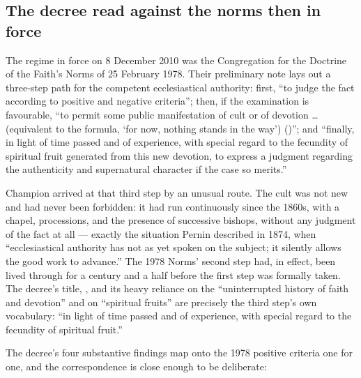 \subsection{The decree read against the norms then in force}

The regime in force on 8 December 2010 was the Congregation for the
Doctrine of the Faith's Norms of 25 February 1978. Their preliminary
note lays out a three-step path for the competent ecclesiastical
authority: first, ``to judge the fact according to positive and
negative criteria''; then, if the examination is favourable, ``to
permit some public manifestation of cult or of devotion \dots{}
(equivalent to the formula, `for now, nothing stands in the way')
()''; and ``finally, in light of time
passed and of experience, with special regard to the fecundity of
spiritual fruit generated from this new devotion, to express a judgment
regarding the authenticity and supernatural character if the case so
merits.''

Champion arrived at that third step by an unusual route. The cult was
not new and had never been forbidden: it had run continuously since the
1860s, with a chapel, processions, and the presence of successive
bishops, without any judgment of the fact at all --- exactly the
situation Pernin described in 1874, when ``ecclesiastical authority has
not as yet spoken on the subject; it silently allows the good work to
advance.'' The 1978 Norms' second step had, in effect, been lived
through for a century and a half before the first step was formally
taken. The decree's title, , and its heavy reliance on the ``uninterrupted history of
faith and devotion'' and on ``spiritual fruits'' are precisely the
third step's own vocabulary: ``in light of time passed and of
experience, with special regard to the fecundity of spiritual fruit.''

The decree's four substantive findings map onto the 1978 positive
criteria one for one, and the correspondence is close enough to be
deliberate:

